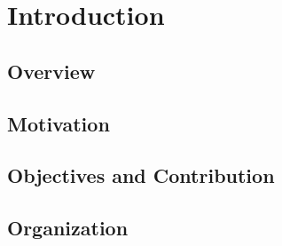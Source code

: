 \chapter{\label{chapter:1_Introduction}Introduction}
\section{\label{section:Overview}Overview}
\section{\label{section:Motivation}Motivation}
\section{\label{section:Objectives}Objectives and Contribution}
\section{\label{section:Organization}Organization}
